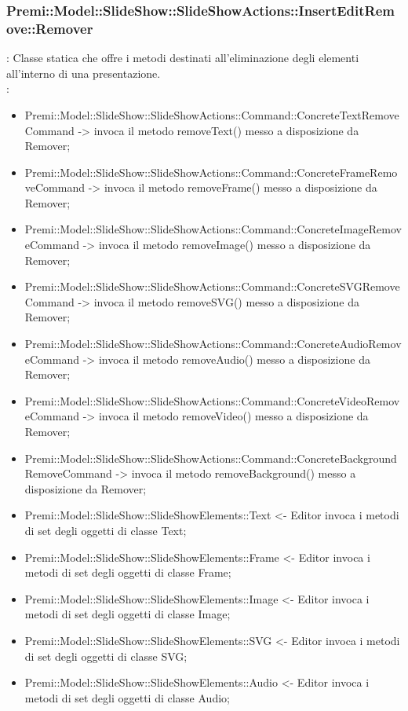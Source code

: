 	\subsubsection{Premi::Model::SlideShow::SlideShowActions::InsertEditRemove::Remover}{
		\textbf{\tipo}: Classe statica che offre i metodi destinati all'eliminazione degli elementi all’interno di una presentazione.\\	
		\textbf{\relaz}:
		\begin{itemize}
			\item Premi::Model::SlideShow::SlideShowActions::Command::ConcreteTextRemoveCommand -> invoca il metodo removeText() messo a disposizione da Remover;
			\item Premi::Model::SlideShow::SlideShowActions::Command::ConcreteFrameRemoveCommand -> invoca il metodo removeFrame() messo a disposizione da Remover;
			\item Premi::Model::SlideShow::SlideShowActions::Command::ConcreteImageRemoveCommand -> invoca il metodo removeImage() messo a disposizione da Remover;
			\item Premi::Model::SlideShow::SlideShowActions::Command::ConcreteSVGRemoveCommand -> invoca il metodo removeSVG() messo a disposizione da Remover;
			\item Premi::Model::SlideShow::SlideShowActions::Command::ConcreteAudioRemoveCommand -> invoca il metodo removeAudio() messo a disposizione da Remover;
			\item Premi::Model::SlideShow::SlideShowActions::Command::ConcreteVideoRemoveCommand -> invoca il metodo removeVideo() messo a disposizione da Remover;
			\item Premi::Model::SlideShow::SlideShowActions::Command::ConcreteBackgroundRemoveCommand -> invoca il metodo removeBackground() messo a disposizione da Remover;
           \item Premi::Model::SlideShow::SlideShowElements::Text <- Editor invoca i metodi di set degli oggetti di classe Text;
           \item Premi::Model::SlideShow::SlideShowElements::Frame <- Editor invoca i metodi di set degli oggetti di classe Frame;
           \item Premi::Model::SlideShow::SlideShowElements::Image <- Editor invoca i metodi di set degli oggetti di classe Image;
           \item Premi::Model::SlideShow::SlideShowElements::SVG <- Editor invoca i metodi di set degli oggetti di classe SVG;
           \item Premi::Model::SlideShow::SlideShowElements::Audio <- Editor invoca i metodi di set degli oggetti di classe Audio;

\end{itemize}}
